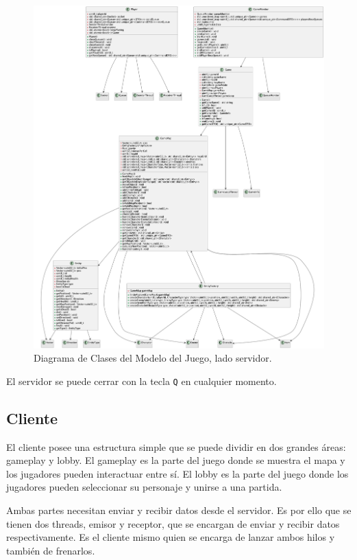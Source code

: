 \documentclass[titlepage,a4paper]{article}
\begin{document}
\begin{figure}[H]
  \centering
  \includegraphics[width=\textwidth]{images/Server Game Classes.png}
  \caption{Diagrama de Clases del Modelo del Juego, lado servidor.}
  \label{fig:server-game}
\end{figure}

El servidor se puede cerrar con la tecla \texttt{Q} en cualquier momento.

\subsection{Cliente}
El cliente posee una estructura simple que se puede dividir en dos grandes áreas: gameplay y lobby. El gameplay es la parte del juego donde se muestra el mapa y los jugadores pueden interactuar entre sí. El lobby es la parte del juego donde los jugadores pueden seleccionar su personaje y unirse a una partida.

Ambas partes necesitan enviar y recibir datos desde el servidor. Es por ello que se tienen dos threads, emisor y receptor, que se encargan de enviar y recibir datos respectivamente. Es el cliente mismo quien se encarga de lanzar ambos hilos y también de frenarlos.
\end{document}
